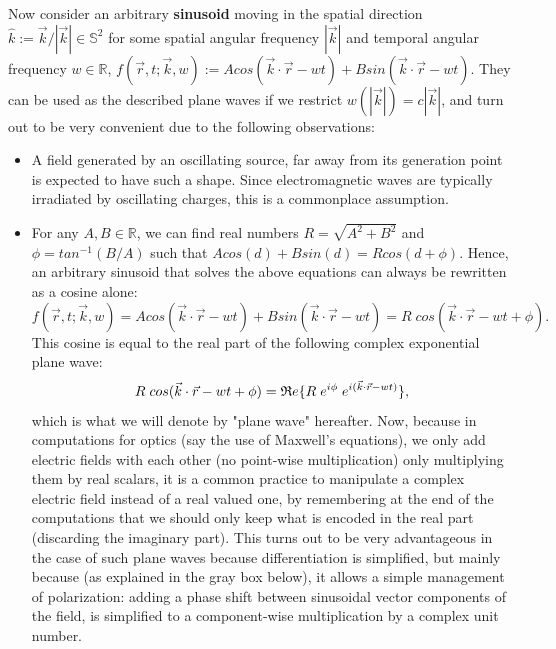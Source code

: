 \documentclass[11pt, a4paper, twoside]{article} %
\newcommand{\R}{\mathbb{R}} %
\begin{document}
Now consider an arbitrary {\bf sinusoid} moving in the spatial direction $\hat{k}:=\vec{k}/|\vec{k}|\in\mathbb{S}^2$ for some spatial angular frequency $|\vec{k}|$ and temporal angular frequency $w\in\R$, $f(\vec{r},t;\vec{k},w):=Acos(\vec{k}\cdot \vec{r}-wt)+Bsin(\vec{k}\cdot \vec{r}-wt)$. They can be used as the described plane waves if we restrict $w(|\vec{k}|)=c|\vec{k}|$, and turn out to be very convenient due to the following observations:\vspace{-0.2cm}
\begin{itemize}
\item A field generated by an oscillating source, far away from its generation point is expected to have such a shape. Since electromagnetic waves are typically irradiated by oscillating charges, this is a commonplace assumption.

\item For any $A,B\in\R$, we can find real numbers $R=\sqrt{A^2+B^2}$ and $\phi=tan^{-1}(B/A)$ such that $Acos(d)+Bsin(d)=Rcos(d+\phi)$. Hence, an arbitrary sinusoid that solves the above equations can always be rewritten as a cosine alone:
\begin{equation}
f(\vec{r},t;\vec{k},w)=Acos(\vec{k}\cdot \vec{r}-wt)+Bsin(\vec{k}\cdot \vec{r}-wt)=R\;cos(\vec{k}\cdot \vec{r}-wt+\phi).
\end{equation}
This cosine is equal to the real part of the following complex exponential plane wave:\vspace{-0.2cm}
\begin{equation}
R\;cos(\vec{k}\cdot \vec{r}-wt+\phi)=\mathfrak{R}e\{R\;e^{i\phi}\;e^{i(\vec{k}\cdot \vec{r}-wt)}\}\vspace{-0.2cm},
\end{equation}
which is what we will denote by "plane wave" hereafter. Now, because in computations for optics (say the use of Maxwell's equations), we only add electric fields with each other (no point-wise multiplication) only multiplying them by real scalars, it is a common practice to manipulate a complex electric field instead of a real valued one, by remembering at the end of the computations that we should only keep what is encoded in the real part (discarding the imaginary part). This turns out to be very advantageous in the case of such plane waves because differentiation is simplified, but mainly because (as explained in the gray box below), it allows a simple management of polarization: adding a phase shift between sinusoidal vector components of the field, is simplified to a component-wise multiplication by a complex unit number.


\end{itemize}
\end{document}
